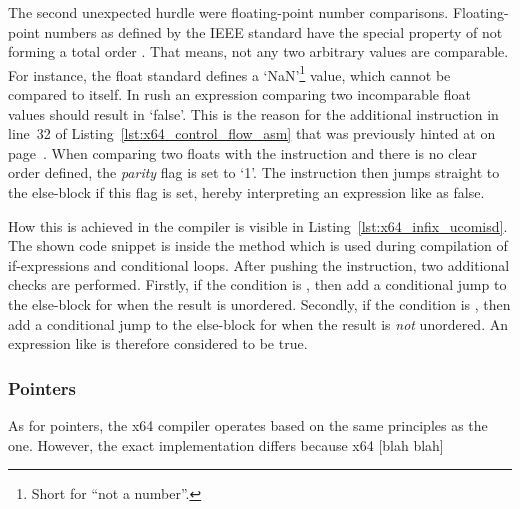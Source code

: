The second unexpected hurdle were floating-point number comparisons.
Floating-point numbers as defined by the IEEE standard have the special property of not forming a total order .
That means, not any two arbitrary values are comparable.
For instance, the float standard defines a `NaN'\footnote{Short for ``not a number''.} value, which cannot be compared to itself.
In rush an expression comparing two incomparable float values should result in `false'.
This is the reason for the additional  instruction in line~32 of Listing~\ref{lst:x64_control_flow_asm} that was previously hinted at on page~\pageref{x64_ucomisd}.
When comparing two floats with the  instruction and there is no clear order defined, the \emph{parity} flag is set to `1'.
The  instruction then jumps straight to the else-block if this flag is set, hereby interpreting an expression like  as false.


How this is achieved in the compiler is visible in Listing~\ref{lst:x64_infix_ucomisd}.
The shown code snippet is inside the  method which is used during compilation of if-expressions and conditional loops.
After pushing the  instruction, two additional checks are performed.
Firstly, if the condition is \qVerb{==}, then add a conditional jump to the else-block for when the result is unordered.
Secondly, if the condition is \qVerb{!=}, then add a conditional jump to the else-block for when the result is \emph{not} unordered.
An expression like  is therefore considered to be true.

\subsubsection{Pointers}

As for pointers, the x64 compiler operates based on the same principles as the \riscv{} one.
However, the exact implementation differs because x64 [blah blah]
